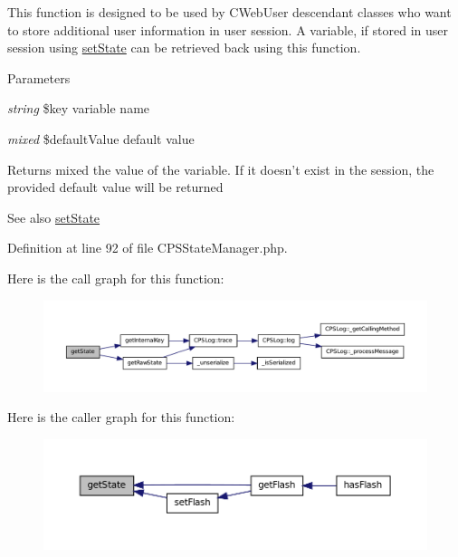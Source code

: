 This function is designed to be used by CWebUser descendant classes who want to store additional user information in user session. A variable, if stored in user session using \hyperlink{}{setState} can be retrieved back using this function.


\begin{DoxyParams}{Parameters}
\item[{\em string}]\$key variable name \item[{\em mixed}]\$defaultValue default value \end{DoxyParams}
\begin{DoxyReturn}{Returns}
mixed the value of the variable. If it doesn't exist in the session, the provided default value will be returned 
\end{DoxyReturn}
\begin{DoxySeeAlso}{See also}
\hyperlink{classCPSStateManager_aafc00fb76764975385c8a3fa54cfece3}{setState} 
\end{DoxySeeAlso}


Definition at line 92 of file CPSStateManager.php.








Here is the call graph for this function:\nopagebreak
\begin{figure}[H]
\begin{center}
\leavevmode
\includegraphics[width=400pt]{classCPSStateManager_a8bf40ae0d2528f36e3df46e28f56e1c8_cgraph}
\end{center}
\end{figure}




Here is the caller graph for this function:\nopagebreak
\begin{figure}[H]
\begin{center}
\leavevmode
\includegraphics[width=400pt]{classCPSStateManager_a8bf40ae0d2528f36e3df46e28f56e1c8_icgraph}
\end{center}
\end{figure}


